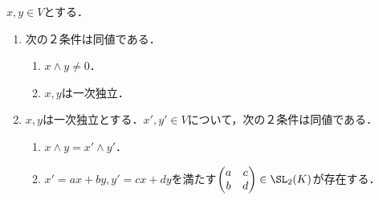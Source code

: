 \documentclass[uplatex, dvipdfmx]{jsreport}
\begin{document}
\begin{proposition}[???]
    $x,y\in V$とする．
    \begin{enumerate}
        \item 次の２条件は同値である．
        \begin{enumerate}[(1)]
            \item $x\wedge y\ne 0$．
            \item $x,y$は一次独立．
        \end{enumerate}
        \item $x,y$は一次独立とする．$x',y'\in V$について，次の２条件は同値である．
        \begin{enumerate}[(1)]
            \item $x\wedge y=x'\wedge y'$．
            \item $x'=ax+by,y'=cx+dy$を満たす$\begin{pmatrix}a&c\\b&d\end{pmatrix}\in\SL_2(K)$が存在する．
        \end{enumerate}
    \end{enumerate}
\end{proposition}
\end{document}
